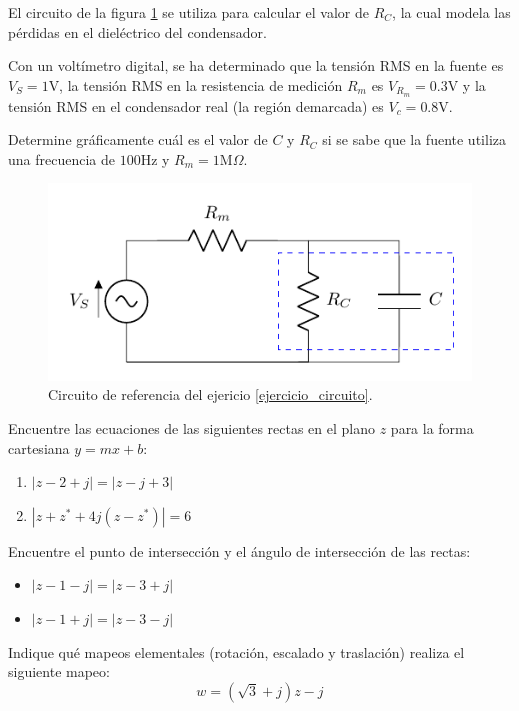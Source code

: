 \begin{ejercicio}
    El circuito de la figura \ref{fig:circuito} se utiliza para calcular el valor de $R_C$, la cual modela las pérdidas en el dieléctrico del condensador.\par
    Con un voltímetro digital, se ha determinado que la tensión RMS en la fuente es $V_S=1$V, la tensión RMS en la resistencia de medición $R_m$ es $V_{R_m}=0.3$V y la tensión RMS en el condensador real (la región demarcada) es $V_c=0.8$V.\par
    Determine gráficamente cuál es el valor de $C$ y $R_C$ si se sabe que la fuente utiliza una frecuencia de $100$Hz y $R_m = 1$M$\Omega$.
    \label{ejercicio_circuito}
    \begin{figure}
        \centering
        \includegraphics[width=0.6\linewidth]{figs/circuit.pdf}
        \caption{Circuito de referencia del ejericio \ref{ejercicio_circuito}.}
        \label{fig:circuito}
    \end{figure}
\end{ejercicio}

\begin{ejercicio}
    Encuentre las ecuaciones de las siguientes rectas en el plano $z$ para la forma cartesiana $y=mx+b$:
    \begin{enumerate}
        \item $|z-2+j| = |z-j+3|$
        \item $|z+z^*+4j(z-z^*)| = 6$
    \end{enumerate}
\end{ejercicio}

\begin{ejercicio}
    Encuentre el punto de intersección y el ángulo de intersección de las rectas:
    \begin{itemize}
        \item $|z-1-j|=|z-3+j|$
        \item $|z-1+j|=|z-3-j|$
    \end{itemize}
\end{ejercicio}

\begin{ejercicio}
    Indique qué mapeos elementales (rotación, escalado y traslación) realiza el siguiente mapeo:
    $$ w = (\sqrt{3}+j)z - j $$
\end{ejercicio}
